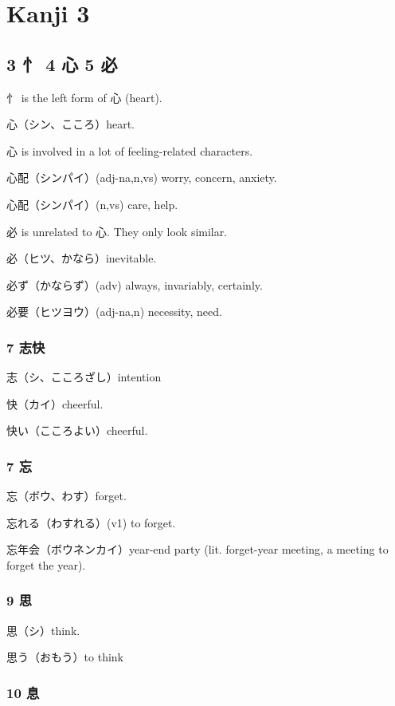 \chapter{Kanji 3}

\section{3 忄 4 心 5 必}

忄 is the left form of 心 (heart).

心（シン、こころ）heart.

心 is involved in a lot of feeling-related characters.

心配（シンパイ）(adj-na,n,vs) worry, concern, anxiety.

心配（シンパイ）(n,vs) care, help.

必 is unrelated to 心. They only look similar.

必（ヒツ、かなら）inevitable.

必ず（かならず）(adv) always, invariably, certainly.

必要（ヒツヨウ）(adj-na,n) necessity, need.

\subsection{7 志快}

志（シ、こころざし）intention

快（カイ）cheerful.

快い（こころよい）cheerful.

\subsection{7 忘}

忘（ボウ、わす）forget.

忘れる（わすれる）(v1) to forget.

忘年会（ボウネンカイ）year-end party
(lit. forget-year meeting, a meeting to forget the year).

\subsection{9 思}

思（シ）think.

思う（おもう）to think

\subsection{10 息}

